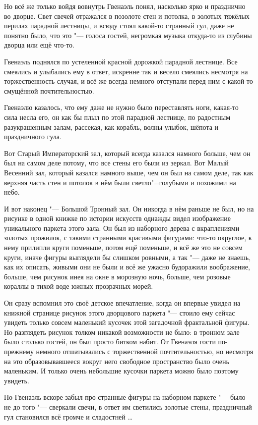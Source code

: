 Но всё же только войдя вовнутрь Гвенаэль понял, насколько ярко и празднично во
дворце.
Свет свечей отражался в позолоте стен и потолка, в золотых тяжёлых перилах
парадной лестницы, и всюду стоял какой-то странный гул, даже не понятно было,
что это "--- голоса гостей, негромкая музыка откуда-то из глубины дворца или ещё
что-то.

Гвенаэль поднялся по устеленной красной дорожкой парадной лестнице.
Все смеялись и улыбались ему в ответ, искренне так и весело смеялись несмотря на
торжественность случая, и всё же всегда немного отступали перед ним с какой-то
смущённой почтительностью.

Гвенаэлю казалось, что ему даже не нужно было переставлять ноги, какая-то сила
несла его, он как бы плыл по этой парадной лестнице, по радостным разукрашенным
залам, рассекая, как корабль, волны улыбок, шёпота и праздничного гула.

Вот Старый Императорский зал, который всегда казался намного больше, чем он был
на самом деле потому, что все стены его были из зеркал.
Вот Малый Весенний зал, который казался намного выше, чем он был на самом деле,
так как верхняя часть стен и потолок в нём были светло"=голубыми и похожими на
небо.

И вот наконец "--- Большой Тронный зал.
Он никогда в нём раньше не был, но на рисунке в одной книжке по истории искусств
однажды видел изображение уникального паркета этого зала.
Он был из наборного дерева с вкраплениями золотых прожилок, с такими странными
красивыми фигурами: что-то округлое, к нему прилипли круги поменьше, потом ещё
поменьше, и всё же это не совсем круги, иначе фигуры выглядели бы слишком
ровными, а так "--- даже не знаешь, как их описать, живыми они не были и всё же
ужасно будоражили воображение, больше, чем рисунок инея на окне в морозную ночь,
больше, чем розовые кораллы в тихой воде южных прозрачных морей.

Он сразу вспомнил это своё детское впечатление, когда он впервые увидел на
книжной странице рисунок этого дворцового паркета "--- стоило ему сейчас увидеть
только совсем маленький кусочек этой загадочной фрактальной фигуры.
Но разглядеть рисунок толком никакой возможности не было: в тронном зале было
столько гостей, он был просто битком набит. От Гвенаэля гости по-прежнему
немного отшатывались с торжественной почтительностью, но несмотря на это
образовывавшееся вокруг него свободное пространство было очень маленьким.
И только очень небольшие кусочки паркета можно было поэтому увидеть.

Но Гвенаэль вскоре забыл про странные фигуры на наборном паркете "--- было не до
того "--- сверкали свечи, в ответ им светились золотые стены, праздничный гул
становился всё громче и сладостней \ldots

